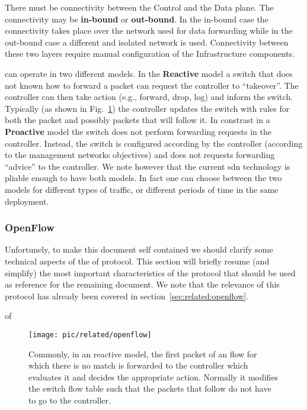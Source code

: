 There must be connectivity between the Control and the Data plane.
The connectivity may be  \textbf{in-bound} or \textbf{out-bound}. 
In the in-bound case the connectivity takes place over the
network used for data forwarding while in the out-bound case a
different and isolated network is used. Connectivity between these two layers require manual configuration of the Infrastructure components. 

 can operate in two different models. In the  \textbf{Reactive} model a switch that does not known how to forward a packet can request the controller to ``takeover''. The controller can then take action (e.g., forward, drop, log)  and inform the switch. Typically (as shown in Fig.~\ref{fig:related:reactive}) the controller updates the switch with rules for both the packet and possibly packets that will follow it.  In constrast in a \textbf{Proactive} model the switch does not perform forwarding requests in the controller. Instead, the switch is configured according by the controller (according to the management networks objectives) and does not requests forwarding ``advice'' to the controller. We note however that the current \gls{sdn} technology is pliable enough to have both models. In fact one can choose between the two models for different types of traffic, or different periods of time in the same deployment. 

\subsubsection{OpenFlow}
Unfortunely, to make this document self contained we should clarify some technical aspects of the  \gls{of}  protocol. This section will briefly resume (and simplify) the most important characteristics of the protocol that should be used as reference for the remaining document. We note that the relevance of this protocol has already been covered in section~\ref{sec:related:openflow}.  


\gls{of} 
\begin{figure}
  \centering
  \texttt{[image: pic/related/openflow]}
  \caption[Flow Request ]{Commonly, in an reactive model, the first packet of an flow for which there is no match is forwarded to the controller which evaluates it and decides the appropriate action. Normally it modifies the switch flow table such that the packets that follow do not have to go to the controller. }
  \label{fig:related:reactive}
\end{figure}

